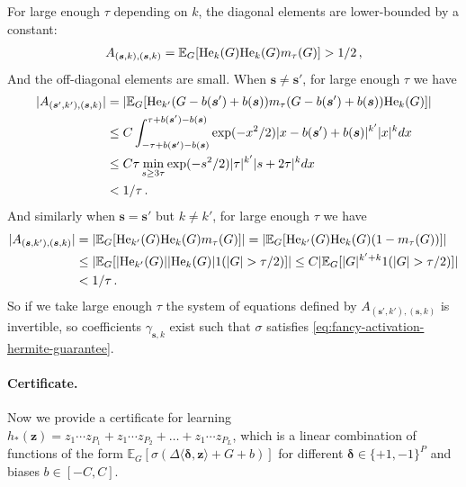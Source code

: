 \documentclass[11pt]{article}
\newcommand{\E}{\mathbb{E}}
\newcommand{\<}{\langle}
\renewcommand{\>}{\rangle}
\theoremstyle{definition}
\def\bs{{\boldsymbol s}}
\def\bz{{\boldsymbol z}}
\def\bdelta{{\boldsymbol\delta}}
\def\bz{{\boldsymbol z}}
\def\He{{\rm He}}
\def\bdelta{{\boldsymbol\delta}}
\def\bz{{\boldsymbol z}}
\def\He{{\rm He}}
\begin{document}
For large enough $\tau$ depending on $k$, the diagonal elements are lower-bounded by a constant:
\begin{align*}
A_{(\bs,k),(\bs,k)} = \E_G[\He_k(G)\He_k(G)m_{\tau}(G)] > 1/2\,,
\end{align*}
And the off-diagonal elements are small. When $\bs \neq \bs'$, for large enough $\tau$ we have
\begin{align*}
|A_{(\bs',k'),(\bs,k)}| &= |\E_{G}[\He_{k'}(G - b(\bs') + b(\bs)) m_{\tau}(G - b(\bs') + b(\bs)) \He_k(G) ]| \\
&\leq C\int_{-\tau+b(\bs') - b(\bs)}^{\tau+b(\bs') - b(\bs)} \exp(-x^2/2) |x-b(\bs')+b(\bs)|^{k'} |x|^{k}dx \\
&\leq C\tau \min_{s \geq 3\tau} \exp(-s^2/2) |\tau|^{k'} |s+2\tau|^{k}dx \\
&< 1/\tau\,.
\end{align*}
And similarly when $\bs = \bs'$ but $k \neq k'$, for large enough $\tau$ we have
\begin{align*}
|A_{(\bs,k'),(\bs,k)}| &= |\E_G[\He_{k'}(G) \He_{k}(G) m_{\tau}(G)]| = |\E_G[\He_{k'}(G) \He_{k}(G) (1 - m_{\tau}(G))]| \\
&\leq |\E_G[|\He_{k'}(G)| |\He_k(G)| 1(|G| > \tau/2)]| \leq C |\E_G[|G|^{k'+k} 1(|G| > \tau/2)]| \\
&< 1/\tau\,.
\end{align*}
So if we take large enough $\tau$ the system of equations defined by $A_{(\bs',k'),(\bs,k)}$ is invertible, so coefficients $\gamma_{\bs,k}$ exist such that $\sigma$ satisfies \eqref{eq:fancy-activation-hermite-guarantee}.

\paragraph*{Certificate.} 
Now we provide a certificate for learning $h_*(\bz) = z_1 \cdots z_{P_1} + z_1 \cdots z_{P_2} + \dots + z_1 \cdots z_{P_L}$, which is a linear combination of functions of the form $\E_G[\sigma(\Delta\<\bdelta,\bz\>+G+b)]$ for different $\bdelta \in \{+1,-1\}^P$ and biases $b \in [-C,C]$.
\end{document}
